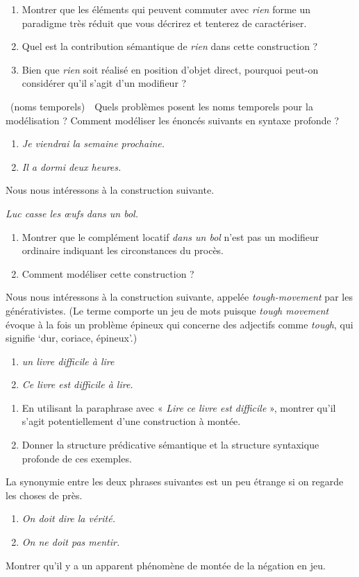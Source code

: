 {\begin{enumerate}
\item Montrer que les éléments qui peuvent commuter avec \textit{rien} forme un paradigme très réduit que vous décrirez et tenterez de caractériser.
\item Quel est la contribution sémantique de \textit{rien} dans cette construction ?
\item Bien que \textit{rien} soit réalisé en position d’objet direct, pourquoi peut-on considérer qu’il s’agit d’un modifieur ?
\end{enumerate}

~(noms temporels)\ \ Quels problèmes posent les noms temporels pour la modélisation ? Comment modéliser les énoncés suivants en syntaxe profonde ?
\begin{enumerate}[label=\alph*.]
\item\textit{Je viendrai la semaine prochaine.}
\item\textit{Il a dormi deux heures.}
\end{enumerate}

 Nous nous intéressons à la construction suivante.
\begin{exe}
\exi{}\textit{Luc casse les œufs dans un bol.}
\end{exe}
\begin{enumerate}
\item Montrer que le complément locatif \textit{dans un bol} n’est pas un modifieur ordinaire indiquant les circonstances du procès.
\item Comment modéliser cette construction ?
\end{enumerate}

 Nous nous intéressons à la construction suivante, appelée \textit{tough-movement} par les générativistes. (Le terme comporte un jeu de mots puisque \textit{tough movement} évoque à la fois un problème épineux qui concerne des adjectifs comme \textit{tough}, qui signifie ‘dur, coriace, épineux’.)
\begin{enumerate}[label=\alph*.]
\item \textit{un livre difficile à lire}
\item\textit{Ce livre est difficile à lire.}
\end{enumerate}
\begin{enumerate}
\item En utilisant la paraphrase avec « \textit{Lire ce livre est difficile} », montrer qu’il s’agit potentiellement d’une construction à montée.
\item Donner la structure prédicative sémantique et la structure syntaxique profonde de ces exemples.
\end{enumerate}

 La synonymie entre les deux phrases suivantes est un peu étrange si on regarde les choses de près.
\begin{enumerate}[label=\alph*.]
\item \textit{On doit dire la vérité.}
\item \textit{On ne doit pas mentir.}
\end{enumerate}
Montrer qu’il y a un apparent phénomène de montée de la négation en jeu.}
